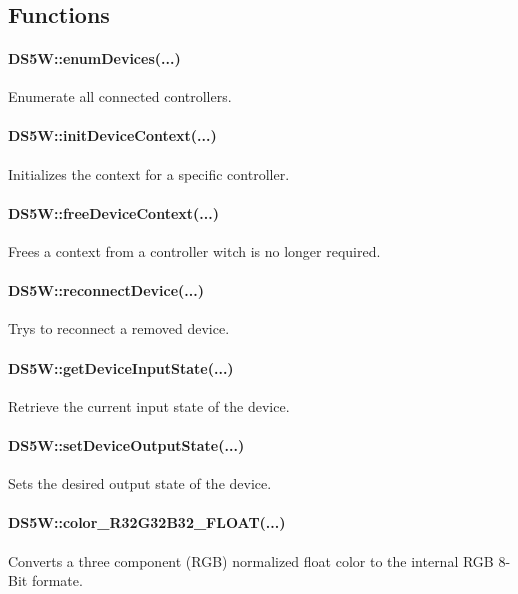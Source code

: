 \\

\newpage

\subsection{Functions}

\paragraph{DS5W::enumDevices(...)}
Enumerate all connected controllers.\\


\paragraph{DS5W::initDeviceContext(...)}
Initializes the context for a specific controller.\\


\paragraph{DS5W::freeDeviceContext(...)}
Frees a context from a controller witch is no longer required.\\


\paragraph{DS5W::reconnectDevice(...)}
Trys to reconnect a removed device.\\


\paragraph{DS5W::getDeviceInputState(...)}
Retrieve the current input state of the device.\\


\paragraph{DS5W::setDeviceOutputState(...)}
Sets the desired output state of the device.\\


\paragraph{DS5W::color\_R32G32B32\_FLOAT(...)} 
Converts a three component (RGB) normalized float color to the internal RGB 8-Bit formate.\\


